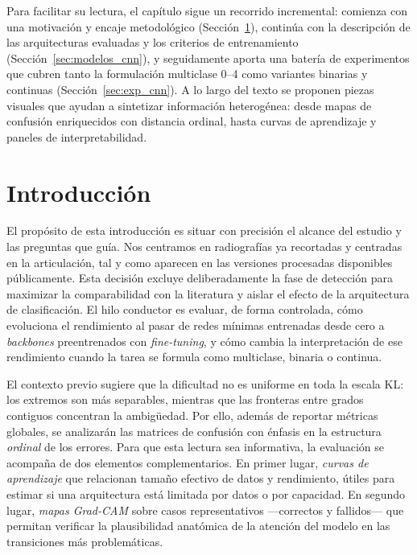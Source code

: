 \documentclass[11pt,spanish,listoffigures,listoftables]{tfgetsinf}
\begin{document}
Para facilitar su lectura, el capítulo sigue un recorrido incremental:
comienza con una motivación y encaje metodológico
(Sección~\ref{sec:intro_cnn}), continúa con la descripción de las arquitecturas
evaluadas y los criterios de entrenamiento (Sección~\ref{sec:modelos_cnn}), y seguidamente aporta una batería de
experimentos que cubren tanto la formulación multiclase 0--4 como variantes
binarias y continuas (Sección~\ref{sec:exp_cnn}). A lo largo del texto se proponen piezas visuales que
ayudan a sintetizar información heterogénea: desde mapas de confusión
enriquecidos con distancia ordinal, hasta curvas de aprendizaje y paneles de
interpretabilidad.

\section{Introducción}
\label{sec:intro_cnn}

El propósito de esta introducción es situar con precisión el alcance del
estudio y las preguntas que guía. Nos centramos en radiografías ya recortadas y
centradas en la articulación, tal y como aparecen en las versiones procesadas
disponibles públicamente. Esta decisión excluye deliberadamente la fase de
detección para maximizar la comparabilidad con la literatura y aislar el efecto
de la arquitectura de clasificación. El hilo conductor es evaluar, de forma
controlada, cómo evoluciona el rendimiento al pasar de redes mínimas entrenadas
desde cero a \textit{backbones} preentrenados con \textit{fine-tuning}, y cómo
cambia la interpretación de ese rendimiento cuando la tarea se formula como
multiclase, binaria o continua.

El contexto previo sugiere que la dificultad no es uniforme en toda la escala
KL: los extremos son más separables, mientras que las fronteras entre grados
contiguos concentran la ambigüedad. Por ello, además de reportar métricas
globales, se analizarán las matrices de confusión con énfasis en la estructura
\emph{ordinal} de los errores. Para que esta lectura sea informativa, la
evaluación se acompaña de dos elementos complementarios. En primer lugar,
\emph{curvas de aprendizaje} que relacionan tamaño efectivo de datos y
rendimiento, útiles para estimar si una arquitectura está limitada por datos o
por capacidad. En segundo lugar, \emph{mapas Grad-CAM} sobre casos
representativos —correctos y fallidos— que permitan verificar la plausibilidad
anatómica de la atención del modelo en las transiciones más problemáticas.
\end{document}
